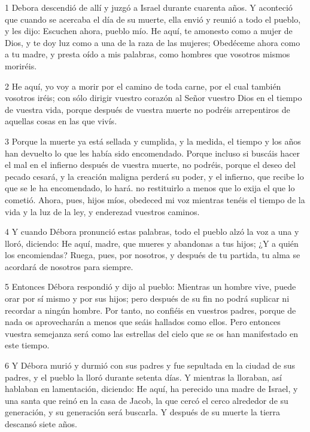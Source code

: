 \par 1 Debora descendió de allí y juzgó a Israel durante cuarenta años. Y aconteció que cuando se acercaba el día de su muerte, ella envió y reunió a todo el pueblo, y les dijo: Escuchen ahora, pueblo mío. He aquí, te amonesto como a mujer de Dios, y te doy luz como a una de la raza de las mujeres; Obedéceme ahora como a tu madre, y presta oído a mis palabras, como hombres que vosotros mismos moriréis.

\par 2 He aquí, yo voy a morir por el camino de toda carne, por el cual también vosotros iréis; con sólo dirigir vuestro corazón al Señor vuestro Dios en el tiempo de vuestra vida, porque después de vuestra muerte no podréis arrepentiros de aquellas cosas en las que vivís.

\par 3 Porque la muerte ya está sellada y cumplida, y la medida, el tiempo y los años han devuelto lo que les había sido encomendado. Porque incluso si buscáis hacer el mal en el infierno después de vuestra muerte, no podréis, porque el deseo del pecado cesará, y la creación maligna perderá su poder, y el infierno, que recibe lo que se le ha encomendado, lo hará. no restituirlo a menos que lo exija el que lo cometió. Ahora, pues, hijos míos, obedeced mi voz mientras tenéis el tiempo de la vida y la luz de la ley, y enderezad vuestros caminos.

\par 4 Y cuando Débora pronunció estas palabras, todo el pueblo alzó la voz a una y lloró, diciendo: He aquí, madre, que mueres y abandonas a tus hijos; ¿Y a quién los encomiendas? Ruega, pues, por nosotros, y después de tu partida, tu alma se acordará de nosotros para siempre.

\par 5 Entonces Débora respondió y dijo al pueblo: Mientras un hombre vive, puede orar por sí mismo y por sus hijos; pero después de su fin no podrá suplicar ni recordar a ningún hombre. Por tanto, no confiéis en vuestros padres, porque de nada os aprovecharán a menos que seáis hallados como ellos. Pero entonces vuestra semejanza será como las estrellas del cielo que se os han manifestado en este tiempo.

\par 6 Y Débora murió y durmió con sus padres y fue sepultada en la ciudad de sus padres, y el pueblo la lloró durante setenta días. Y mientras la lloraban, así hablaban en lamentación, diciendo: He aquí, ha perecido una madre de Israel, y una santa que reinó en la casa de Jacob, la que cercó el cerco alrededor de su generación, y su generación será buscarla. Y después de su muerte la tierra descansó siete años.

